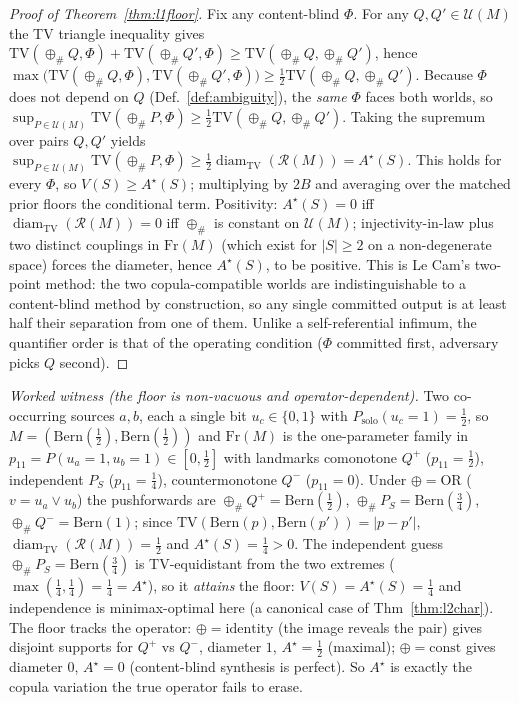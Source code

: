 \documentclass[11pt]{article}
\begin{document}
\begin{proof}[Proof of Theorem~\ref{thm:l1floor}]
Fix any content-blind $\Phi$. For any $Q,Q'\in\mathcal U(M)$ the TV triangle inequality gives
$\mathrm{TV}(\oplus_{\#}Q,\Phi)+\mathrm{TV}(\oplus_{\#}Q',\Phi)\ge\mathrm{TV}(\oplus_{\#}Q,\oplus_{\#}Q')$,
hence
$\max\!\big(\mathrm{TV}(\oplus_{\#}Q,\Phi),\mathrm{TV}(\oplus_{\#}Q',\Phi)\big)\ge\tfrac12\mathrm{TV}(\oplus_{\#}Q,\oplus_{\#}Q')$.
Because $\Phi$ does not depend on $Q$ (Def.~\ref{def:ambiguity}), the \emph{same} $\Phi$ faces both
worlds, so $\sup_{P\in\mathcal U(M)}\mathrm{TV}(\oplus_{\#}P,\Phi)\ge\tfrac12\mathrm{TV}(\oplus_{\#}Q,\oplus_{\#}Q')$.
Taking the supremum over pairs $Q,Q'$ yields
$\sup_{P\in\mathcal U(M)}\mathrm{TV}(\oplus_{\#}P,\Phi)\ge\tfrac12\operatorname{diam}_{\mathrm{TV}}(\mathcal R(M))=A^\star(S)$.
This holds for every $\Phi$, so $V(S)\ge A^\star(S)$; multiplying by $2B$ and averaging over the
matched prior floors the conditional term. Positivity: $A^\star(S)=0$ iff
$\operatorname{diam}_{\mathrm{TV}}(\mathcal R(M))=0$ iff $\oplus_{\#}$ is constant on $\mathcal U(M)$;
injectivity-in-law plus two distinct couplings in $\mathrm{Fr}(M)$ (which exist for $|S|\ge2$ on a
non-degenerate space) forces the diameter, hence $A^\star(S)$, to be positive. This is Le Cam's
two-point method: the two copula-compatible worlds are indistinguishable to a content-blind method
by construction, so any single committed output is at least half their separation from one of them.
Unlike a self-referential infimum, the quantifier order is that of the operating condition ($\Phi$
committed first, adversary picks $Q$ second).
\end{proof}

\emph{Worked witness (the floor is non-vacuous and operator-dependent).} Two co-occurring sources
$a,b$, each a single bit $u_c\in\{0,1\}$ with $P_{\mathrm{solo}}(u_c{=}1)=\tfrac12$, so
$M=(\mathrm{Bern}(\tfrac12),\mathrm{Bern}(\tfrac12))$ and $\mathrm{Fr}(M)$ is the one-parameter
family in $p_{11}=P(u_a{=}1,u_b{=}1)\in[0,\tfrac12]$ with landmarks comonotone $Q^+$
($p_{11}{=}\tfrac12$), independent $P_S$ ($p_{11}{=}\tfrac14$), countermonotone $Q^-$
($p_{11}{=}0$). Under $\oplus=\mathrm{OR}$ ($v=u_a\vee u_b$) the pushforwards are
$\oplus_{\#}Q^+=\mathrm{Bern}(\tfrac12)$, $\oplus_{\#}P_S=\mathrm{Bern}(\tfrac34)$,
$\oplus_{\#}Q^-=\mathrm{Bern}(1)$; since $\mathrm{TV}(\mathrm{Bern}(p),\mathrm{Bern}(p'))=|p-p'|$,
$\operatorname{diam}_{\mathrm{TV}}(\mathcal R(M))=\tfrac12$ and $A^\star(S)=\tfrac14>0$. The
independent guess $\oplus_{\#}P_S=\mathrm{Bern}(\tfrac34)$ is TV-equidistant from the two extremes
($\max(\tfrac14,\tfrac14)=\tfrac14=A^\star$), so it \emph{attains} the floor:
$V(S)=A^\star(S)=\tfrac14$ and independence is minimax-optimal here (a canonical case of
Thm~\ref{thm:l2char}). The floor tracks the operator: $\oplus=\mathrm{identity}$ (the image reveals
the pair) gives disjoint supports for $Q^+$ vs $Q^-$, diameter $1$, $A^\star=\tfrac12$ (maximal);
$\oplus=\mathrm{const}$ gives diameter $0$, $A^\star=0$ (content-blind synthesis is perfect). So
$A^\star$ is exactly the copula variation the true operator fails to erase.
\end{document}
